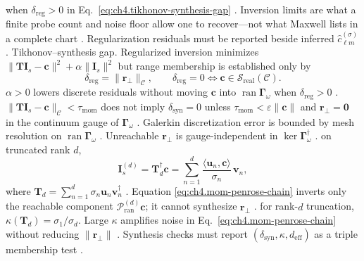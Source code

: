 when \(\delta_{\mathrm{reg}}>0\) in Eq.~\eqref{eq:ch4.tikhonov-synthesis-gap} \cite{harrington2001}.
Inversion limits are what a finite probe count and noise floor allow one to recover---not what Maxwell lists in a complete chart \cite{devaney2004}. Regularization residuals must be reported beside inferred $\widehat{c}_{\ell m}^{(\sigma)}$ \cite{stratton1941}.
Tikhonov--synthesis gap. Regularized inversion minimizes
\(\|\mathbf{T}\mathbf{I}_{s}-\mathbf{c}\|^{2}+\alpha\|\mathbf{I}_{s}\|^{2}\) but range membership is established only by
\begin{equation}
\label{eq:ch4.tikhonov-synthesis-gap}
\delta_{\mathrm{reg}}=\|\mathbf{r}_{\perp}\|_{\mathcal{C}},\qquad
\delta_{\mathrm{reg}}=0\iff\mathbf{c}\in\mathcal{S}_{\mathrm{real}}(\mathcal{C}).
\end{equation}
\label{cor:ch4.reg-not-realizable}
\(\alpha>0\) lowers discrete residuals without moving \(\mathbf{c}\) into \(\operatorname{ran}\boldsymbol{\Gamma}_\omega\) when \(\delta_{\mathrm{reg}}>0\)
\cite{harrington2001}.
\label{thm:ch4.discrete-continuum-gap}
\(\|\mathbf{T}\mathbf{I}_{s}-\mathbf{c}\|_{\mathcal{C}}<\tau_{\mathrm{mom}}\) does not imply \(\delta_{\mathrm{syn}}=0\) unless
\(\tau_{\mathrm{mom}}<\varepsilon\|\mathbf{c}\|\) and \(\mathbf{r}_{\perp}=\mathbf{0}\) in the continuum gauge of \(\boldsymbol{\Gamma}_\omega\)
\cite{harrington2001}.
Galerkin discretization error is bounded by mesh resolution on \(\operatorname{ran}\boldsymbol{\Gamma}_\omega\) \cite{harrington2001}. Unreachable
\(\mathbf{r}_{\perp}\) is gauge-independent in \(\ker\boldsymbol{\Gamma}_\omega^{\dagger}\) \cite{stratton1941}.
on truncated rank \(d\),
\begin{equation}
\label{eq:ch4.mom-penrose-chain}
\mathbf{I}_{s}^{(d)}=\mathbf{T}_{d}^{\dagger}\mathbf{c}
=\sum_{n=1}^{d}\frac{\langle\mathbf{u}_{n},\mathbf{c}\rangle}{\sigma_{n}}\,\mathbf{v}_{n},
\end{equation}
where \(\mathbf{T}_{d}=\sum_{n=1}^{d}\sigma_{n}\mathbf{u}_{n}\mathbf{v}_{n}^{\dagger}\) \cite{harrington2001}. Equation
\eqref{eq:ch4.mom-penrose-chain} inverts only the reachable component \(\mathcal{P}_{\mathrm{ran}}^{(d)}\mathbf{c}\); it cannot synthesize
\(\mathbf{r}_{\perp}\) \cite{stratton1941}.
for rank-\(d\) truncation, \(\kappa(\mathbf{T}_{d})=\sigma_{1}/\sigma_{d}\). Large \(\kappa\) amplifies noise in Eq.~\eqref{eq:ch4.mom-penrose-chain}
without reducing \(\|\mathbf{r}_{\perp}\|\) \cite{hansen1988}. Synthesis checks must report \((\delta_{\mathrm{syn}},\kappa,d_{\mathrm{eff}})\)
as a triple membership test \cite{stratton1941}.
